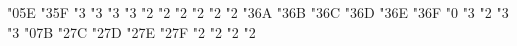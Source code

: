 {  \mathchardef\sphericalangle       "0\hex\msamfam 5E
  \mathchardef\varpropto            "3\hex\msamfam 5F
  \mathchardef\smallsmile           "3\hex{}
  \mathchardef\smallfrown           "3\hex{}
  \mathchardef\Subset               "3\hex{}
  \mathchardef\Supset               "3\hex{}
  \mathchardef\Cup                  "2\hex{}
  \let\doublecup\Cup
  \mathchardef\Cap                  "2\hex{}
  \let\doublecap\Cap
  \mathchardef\curlywedge           "2\hex{}
  \mathchardef\curlyvee             "2\hex{}
  \mathchardef\leftthreetimes       "2\hex{}
  \mathchardef\rightthreetimes      "2\hex{}
  \mathchardef\subseteqq            "3\hex\msamfam 6A
  \mathchardef\supseteqq            "3\hex\msamfam 6B
  \mathchardef\bumpeq               "3\hex\msamfam 6C
  \mathchardef\Bumpeq               "3\hex\msamfam 6D
  \mathchardef\lll                  "3\hex\msamfam 6E
  \let\llless\lll
  \mathchardef\ggg                  "3\hex\msamfam 6F
  \let\gggtr\ggg
  \edef\ulcorner{\delimiter "4\hex\msamfam 70\hex\msamfam 70 }%
  \edef\urcorner{\delimiter "5\hex\msamfam 71\hex\msamfam 71 }%
  \mathchardef\circledS             "0\hex{}
  \mathchardef\pitchfork            "3\hex{}
  \mathchardef\dotplus              "2\hex{}
  \mathchardef\backsim              "3\hex{}
  \mathchardef\backsimeq            "3\hex{}
  \edef\llcorner{\delimiter "4\hex\msamfam 78\hex\msamfam 78 }%
  \edef\lrcorner{\delimiter "5\hex\msamfam 79\hex\msamfam 79 }%
  \mathchardef\complement           "0\hex\msamfam 7B
  \mathchardef\intercal             "2\hex\msamfam 7C
  \mathchardef\circledcirc          "2\hex\msamfam 7D
  \mathchardef\circledast           "2\hex\msamfam 7E
  \mathchardef\circleddash          "2\hex\msamfam 7F
  \mathchardef\rhd                  "2\hex{}
  \mathchardef\lhd                  "2\hex{}
  \mathchardef\unrhd                "2\hex{}
  \mathchardef\unlhd                "2\hex{}
}

